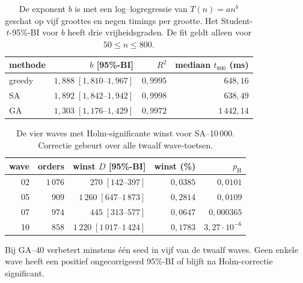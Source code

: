 \begin{table}[H]
\centering
\caption{De exponent $b$ is met een log--logregressie van $T(n)=a n^b$ geschat
op vijf groottes en negen timings per grootte. Het Student-$t$-95\%-BI voor $b$
heeft drie vrijheidsgraden. De fit geldt alleen voor $50\leq n\leq800$.}
\label{tab:app-scaling}
\begin{tabular}{@{}lrrr@{}}
\toprule
\textbf{methode} & \textbf{$b$ [95\%-BI]} & \textbf{$R^2$} &
\textbf{mediaan $t_{800}$ (ms)} \\
\midrule
greedy & $1,888\;[1,810\text{--}1,967]$ & $0,9995$ & $648,16$ \\
SA     & $1,892\;[1,842\text{--}1,942]$ & $0,9998$ & $638,49$ \\
GA     & $1,303\;[1,176\text{--}1,429]$ & $0,9972$ & $1\,442,14$ \\
\bottomrule
\end{tabular}
\end{table}

\begin{table}[H]
\centering
\caption{De vier waves met Holm-significante winst voor SA--10\,000. Correctie
gebeurt over alle twaalf wave-toetsen.}
\label{tab:app-waves}
\begin{tabular}{@{}rrrrr@{}}
\toprule
\textbf{wave} & \textbf{orders} & \textbf{winst $D$ [95\%-BI]} &
\textbf{winst (\%)} & \textbf{$p_{\mathrm H}$} \\
\midrule
02 & $1\,076$ & $270\;[142\text{--}397]$       & $0,0385$ & $0,0101$ \\
05 & $909$     & $1\,260\;[647\text{--}1\,873]$ & $0,2814$ & $0,0109$ \\
07 & $974$     & $445\;[313\text{--}577]$       & $0,0647$ & $0,000365$ \\
10 & $858$     & $1\,220\;[1\,017\text{--}1\,424]$ & $0,1783$ & $3,27\!\cdot\!10^{-6}$ \\
\bottomrule
\end{tabular}
\end{table}

\noindent Bij GA--40 verbetert minstens één seed in vijf van de twaalf waves.
Geen enkele wave heeft een positief ongecorrigeerd 95\%-BI of blijft na
Holm-correctie significant.

